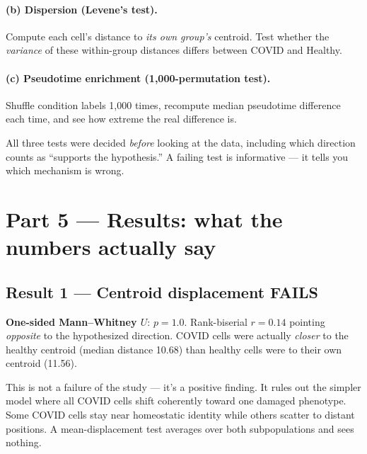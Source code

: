 \documentclass[11pt]{article}
\begin{document}
\paragraph{(b) Dispersion (Levene's test).}
Compute each cell's distance to \emph{its own group's} centroid. Test whether the \emph{variance} of these within-group distances differs between COVID and Healthy.

\paragraph{(c) Pseudotime enrichment (1{,}000-permutation test).}
Shuffle condition labels 1{,}000 times, recompute median pseudotime difference each time, and see how extreme the real difference is.

\begin{resultbox}
All three tests were decided \emph{before} looking at the data, including which direction counts as ``supports the hypothesis.'' A failing test is informative --- it tells you which mechanism is wrong.
\end{resultbox}


\section{Part 5 --- Results: what the numbers actually say}

\subsection{Result 1 --- Centroid displacement FAILS}

\begin{resultbox}
\textbf{One-sided Mann--Whitney $U$}: $p = 1.0$. Rank-biserial $r = 0.14$ pointing \emph{opposite} to the hypothesized direction. COVID cells were actually \emph{closer} to the healthy centroid (median distance 10.68) than healthy cells were to their own centroid (11.56).
\end{resultbox}

This is not a failure of the study --- it's a positive finding. It rules out the simpler model where all COVID cells shift coherently toward one damaged phenotype. Some COVID cells stay near homeostatic identity while others scatter to distant positions. A mean-displacement test averages over both subpopulations and sees nothing.
\end{document}

